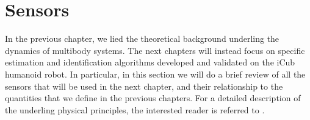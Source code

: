 \chapter{Sensors}
\label{sensors}

In the previous chapter, we lied the theoretical background underling the dynamics of multibody systems. The next chapters will instead focus on specific estimation and identification algorithms developed and validated on the iCub humanoid robot. 
In particular, in this section we will do a brief review of all the sensors that will be used in the next chapter, and their relationship to the quantities that we define in the previous chapters. For a detailed description of the underling physical principles, the interested reader is referred to \citep[Chapter 4]{doebelin2003}. 


